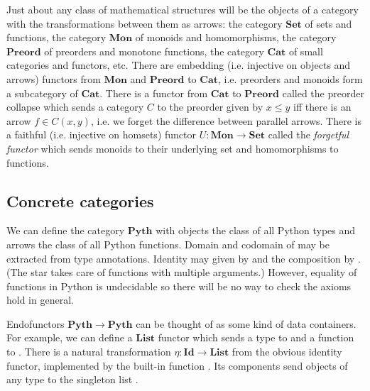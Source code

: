 \begin{example}
Just about any class of mathematical structures will be the objects of a category with the transformations between them as arrows: the category $\mathbf{Set}$ of sets and functions, the category $\mathbf{Mon}$ of monoids and homomorphisms, the category $\mathbf{Preord}$ of preorders and monotone functions, the category $\mathbf{Cat}$ of small categories and functors, etc.
There are embedding (i.e. injective on objects and arrows) functors from $\mathbf{Mon}$ and $\mathbf{Preord}$ to $\mathbf{Cat}$, i.e. preorders and monoids form a subcategory of $\mathbf{Cat}$.
There is a functor from $\mathbf{Cat}$ to $\mathbf{Preord}$ called the preorder collapse which sends a category $C$ to the preorder given by $x \leq y$ iff there is an arrow $f \in C(x, y)$, i.e. we forget the difference between parallel arrows.
There is a faithful (i.e. injective on homsets) functor $U : \mathbf{Mon} \to \mathbf{Set}$ called the \emph{forgetful functor} which sends monoids to their underlying set and homomorphisms to functions.
\end{example}

\subsection{Concrete categories}

\begin{example}\label{ex:python categories}
We can define the category $\mathbf{Pyth}$ with objects the class of all Python types and arrows the class of all Python functions.
Domain and codomain of may be extracted from type annotations.
Identity may given by  and the composition by . (The star takes care of functions with multiple arguments.)
However, equality of functions in Python is undecidable so there will be no way to check the axioms hold in general.

Endofunctors $\mathbf{Pyth} \to \mathbf{Pyth}$ can be thought of as some kind of data containers.
For example, we can define a $\mathbf{List}$ functor which sends a type  to  and a function  to .
There is a natural transformation $\eta : \mathbf{Id} \to \mathbf{List}$ from the obvious identity functor, implemented by the built-in function .
Its components send objects  of any type  to the singleton list .
\end{example}

